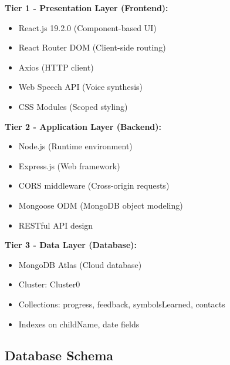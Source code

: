 \documentclass[12pt, a4paper]{article}
\begin{document}
\begin{tcolorbox}[colback=gray!5, colframe=gray!50, title=\textbf{Three-Tier Architecture}]

\textbf{Tier 1 - Presentation Layer (Frontend):}
\begin{itemize}
    \item React.js 19.2.0 (Component-based UI)
    \item React Router DOM (Client-side routing)
    \item Axios (HTTP client)
    \item Web Speech API (Voice synthesis)
    \item CSS Modules (Scoped styling)
\end{itemize}

\textbf{Tier 2 - Application Layer (Backend):}
\begin{itemize}
    \item Node.js (Runtime environment)
    \item Express.js (Web framework)
    \item CORS middleware (Cross-origin requests)
    \item Mongoose ODM (MongoDB object modeling)
    \item RESTful API design
\end{itemize}

\textbf{Tier 3 - Data Layer (Database):}
\begin{itemize}
    \item MongoDB Atlas (Cloud database)
    \item Cluster: Cluster0
    \item Collections: progress, feedback, symbolsLearned, contacts
    \item Indexes on childName, date fields
\end{itemize}

\end{tcolorbox}

\subsection{Database Schema}
\end{document}
